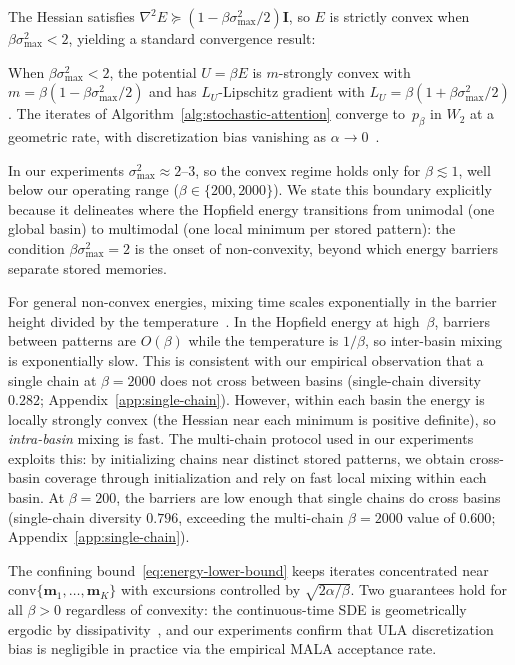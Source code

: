 The Hessian satisfies $\nabla^2 E \succeq (1-\beta\sigma_{\max}^{2}/2)\mathbf{I}$, so $E$ is strictly convex when $\beta\sigma_{\max}^{2}<2$, yielding a standard convergence result:

\begin{corollary}\label{cor:convergence}
When $\beta\sigma_{\max}^{2}<2$, the potential $U=\beta E$ is $m$-strongly convex with $m=\beta(1-\beta\sigma_{\max}^{2}/2)$ and has $L_{U}$-Lipschitz gradient with $L_{U}=\beta(1+\beta\sigma_{\max}^{2}/2)$. The iterates of Algorithm~\ref{alg:stochastic-attention} converge to~$p_\beta$ in $W_2$ at a geometric rate, with discretization bias vanishing as $\alpha\to 0$~\cite{dalalyanTheoreticalGuaranteesApproximate2017,durmusNonasymptoticAnalysisUnadjusted2017}.
\end{corollary}

In our experiments $\sigma_{\max}^{2}\approx 2$--$3$, so the convex regime holds only for $\beta\lesssim 1$, well below our operating range ($\beta\in\{200,2000\}$). We state this boundary explicitly because it delineates where the Hopfield energy transitions from unimodal (one global basin) to multimodal (one local minimum per stored pattern): the condition $\beta\sigma_{\max}^{2}=2$ is the onset of non-convexity, beyond which energy barriers separate stored memories.

For general non-convex energies, mixing time scales exponentially in the barrier height divided by the temperature~\cite{bovier2004metastability}. In the Hopfield energy at high~$\beta$, barriers between patterns are $O(\beta)$ while the temperature is $1/\beta$, so inter-basin mixing is exponentially slow. This is consistent with our empirical observation that a single chain at $\beta{=}2000$ does not cross between basins (single-chain diversity $0.282$; Appendix~\ref{app:single-chain}). However, within each basin the energy is locally strongly convex (the Hessian near each minimum is positive definite), so \emph{intra-basin} mixing is fast. The multi-chain protocol used in our experiments exploits this: by initializing chains near distinct stored patterns, we obtain cross-basin coverage through initialization and rely on fast local mixing within each basin. At $\beta{=}200$, the barriers are low enough that single chains do cross basins (single-chain diversity $0.796$, exceeding the multi-chain $\beta{=}2000$ value of $0.600$; Appendix~\ref{app:single-chain}).

The confining bound~\eqref{eq:energy-lower-bound} keeps iterates concentrated near $\mathrm{conv}\{\mathbf{m}_1,\dots,\mathbf{m}_K\}$ with excursions controlled by $\sqrt{2\alpha/\beta}$. Two guarantees hold for all $\beta>0$ regardless of convexity: the continuous-time SDE is geometrically ergodic by dissipativity~\cite{robertsTweedieExponentialConvergence1996}, and our experiments confirm that ULA discretization bias is negligible in practice via the empirical MALA acceptance rate.

